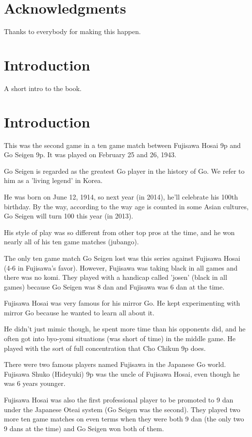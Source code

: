 \documentclass[letterpaper,12pt]{memoir}
\begin{document}
\chapter{Acknowledgments}
Thanks to everybody for making this happen.



\chapter{Introduction}
A short intro to the book.



\mainmatter
\chapter{Introduction}
This was the second game in a ten game match between Fujisawa Hosai 9p and Go Seigen 9p. It was played on February 25 and 26, 1943.

Go Seigen is regarded as the greatest Go player in the history of Go. We refer to him as a 'living legend' in Korea. 

He was born on June 12, 1914, so next year (in 2014), he'll celebrate his 100th birthday. By the way, according to the way age is counted in some Asian cultures, Go Seigen will turn 100 this year (in 2013).

His style of play was so different from other top pros at the time, and he won nearly all of his ten game matches (jubango).

The only ten game match Go Seigen lost was this series against Fujisawa Hosai (4-6 in Fujisawa's favor). However, Fujisawa was taking black in all games and there was no komi. They played with a handicap called 'josen' (black in all games) because Go Seigen was 8 dan and Fujisawa was 6 dan at the time.

Fujisawa Hosai was very famous for his mirror Go. He kept experimenting with mirror Go because he wanted to learn all about it.

He didn't just mimic though, he spent more time than his opponents did, and he often got into byo-yomi situations (was short of time) in the middle game. He played with the sort of full concentration that Cho Chikun 9p does.

There were two famous players named Fujisawa in the Japanese Go world. Fujisawa Shuko (Hideyuki) 9p was the uncle of Fujisawa Hosai, even though he was 6 years younger.

Fujisawa Hosai was also the first professional player to be promoted to 9 dan under the Japanese Oteai system (Go Seigen was the second). They played two more ten game matches on even terms when they were both 9 dan (the only two 9 dans at the time) and Go Seigen won both of them.
\end{document}
